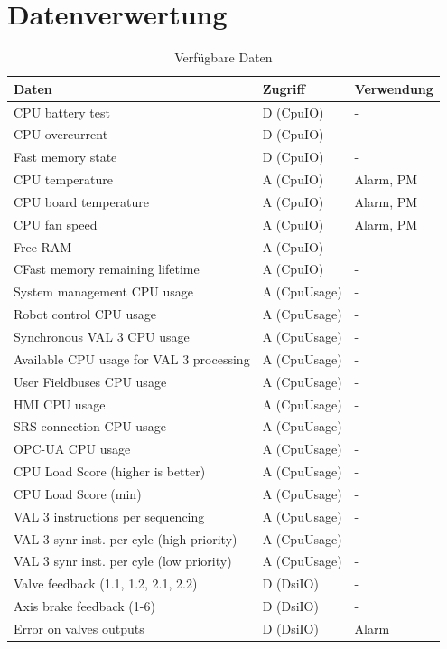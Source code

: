 \documentclass[ a4paper,
                oneside,
                toc=bibliography,
                toc=listof
                ]{scrbook}
\begin{document}
	\section{Datenverwertung}
	
	\begin{longtable}{|p{7cm}|p{3cm}|p{3cm}|}
		\caption{Verfügbare Daten}
		\label{table:Daten}\\
		\hline
		Daten & Zugriff & Verwendung  \\ [0.5ex] 
		\hline
		\endhead
		CPU battery test & D (CpuIO) & -  \\ 
		CPU overcurrent & D (CpuIO) & -  \\
		Fast memory state & D (CpuIO) & - \\
		CPU temperature & A (CpuIO) & Alarm, PM \\
		CPU board temperature & A (CpuIO) & Alarm, PM \\
		CPU fan speed & A (CpuIO) & Alarm, PM \\
		Free RAM & A (CpuIO) & - \\
		CFast memory remaining lifetime & A (CpuIO) & - \\
		\hline
		System management CPU usage & A (CpuUsage) & - \\
		Robot control CPU usage & A (CpuUsage) & - \\			
		Synchronous VAL 3 CPU usage & A (CpuUsage) & - \\
		Available CPU usage for VAL 3 processing& A (CpuUsage) & - \\
		User Fieldbuses CPU usage & A (CpuUsage) & - \\
		HMI CPU usage & A (CpuUsage) & - \\
		SRS connection CPU usage & A (CpuUsage) & - \\
		OPC-UA CPU usage & A (CpuUsage) & - \\
		CPU Load Score (higher is better)& A (CpuUsage) & - \\
		CPU Load Score (min) & A (CpuUsage) & - \\
		VAL 3 instructions per sequencing & A (CpuUsage) & - \\
		VAL 3 synr inst. per cyle (high priority) & A (CpuUsage) & - \\
		VAL 3 synr inst. per cyle (low priority) & A (CpuUsage) & - \\
		\hline
		Valve feedback (1.1, 1.2, 2.1, 2.2) & D (DsiIO) & - \\
		Axis brake feedback (1-6) & D (DsiIO) & - \\
		Error on valves outputs & D (DsiIO) & Alarm \\

\end{longtable}
\end{document}
